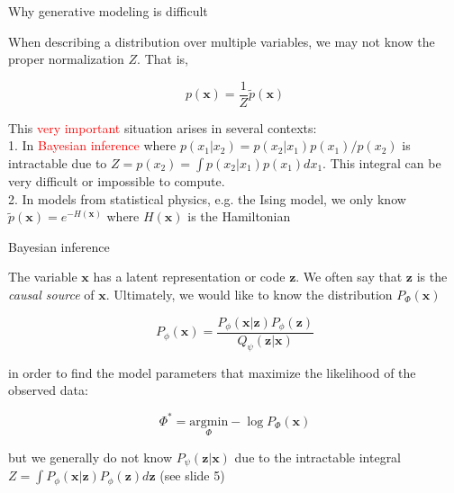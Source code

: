 \documentclass{beamer}					%
\begin{document}
\begin{frame}{Why generative modeling is difficult}

When describing a distribution over multiple variables, we may not know the proper normalization $Z$. That is,

\begin{equation*}
p(\mathbf{x}) = \frac{1}{Z}\tilde{p}(\mathbf{x})
\end{equation*}

\vspace{0.1in}
This \textcolor{red}{very important} situation arises in several contexts:\\
\vspace{0.1in}
1. In \textcolor{red}{Bayesian inference} where $p(x_{1}|x_{2}) = p(x_{2}|x_{1})p(x_{1})/p(x_{2})$ is intractable due to $Z = p(x_{2}) = \int p(x_{2}|x_{1})p(x_{1})dx_{1}$. This integral can be very difficult or impossible to
compute.\\
\vspace{0.1in}
2. In models from statistical physics, e.g. the Ising model, we only know
$\tilde{p}(\mathbf{x}) = e^{−H(\mathbf{x})}$ where $H(\mathbf{x})$ is the Hamiltonian

\end{frame}

%


\begin{frame}{Bayesian inference}

The variable $\mathbf{x}$ has a latent representation or code $\mathbf{z}$. We often say that $\mathbf{z}$ is the \emph{causal source} of $\mathbf{x}$. Ultimately, we would like to know the distribution $P_{\Phi}(\mathbf{x})$

\begin{equation*}
P_{\phi}(\mathbf{x}) = \frac{P_{\phi}(\mathbf{x|z})P_{\phi}(\mathbf{z})}{Q_{\psi}(\mathbf{z|x})}
\end{equation*}

in order to find the model parameters that maximize the likelihood of the observed data:

\begin{equation*}
\Phi^{*} = \underset{\Phi}{\mathrm{argmin}} -\log P_{\Phi}(\mathbf{x}) 
\end{equation*}

but we generally do not know $P_{\psi}(\mathbf{z|x})$ due to the intractable integral $Z = \int P_{\phi}(\mathbf{x|z})P_{\phi}(\mathbf{z})d\mathbf{z}$ (see slide 5)

\end{frame}
\end{document}
